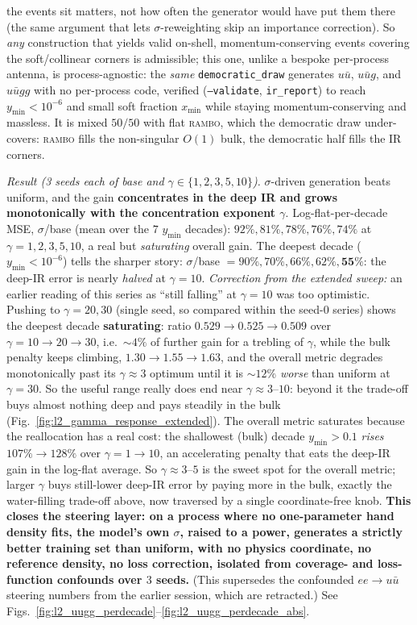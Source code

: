 \documentclass[11pt]{article}
\newcommand{\code}[1]{\texttt{#1}}
\begin{document}
the events sit matters, not how often the generator would have put them there (the same argument that
lets $\sigma$-reweighting skip an importance correction). So \emph{any} construction that yields valid
on-shell, momentum-conserving events covering the soft/collinear corners is admissible; this one,
unlike a bespoke per-process antenna, is process-agnostic: the \emph{same} \code{democratic\_draw}
generates $u\bar u$, $u\bar u g$, and $u\bar u gg$ with no per-process code, verified (\code{--validate},
\code{ir\_report}) to reach $y_{\min}\!<\!10^{-6}$ and small soft fraction $x_{\min}$ while staying
momentum-conserving and massless. It is mixed $50/50$ with flat \textsc{rambo}, which the democratic
draw under-covers: \textsc{rambo} fills the non-singular $O(1)$ bulk, the democratic half fills the
IR corners.

\emph{Result (3 seeds each of base and $\gamma\!\in\!\{1,2,3,5,10\}$).} $\sigma$-driven generation
beats uniform, and the gain \textbf{concentrates in the deep IR and grows monotonically with the
concentration exponent $\gamma$}. Log-flat-per-decade MSE, $\sigma$/base (mean over the $7$ $y_{\min}$
decades): $92\%,81\%,78\%,76\%,74\%$ at $\gamma{=}1,2,3,5,10$, a real but \emph{saturating} overall
gain. The deepest decade ($y_{\min}\!<\!10^{-6}$) tells the sharper story: $\sigma$/base
$=90\%,70\%,66\%,62\%,\mathbf{55\%}$: the deep-IR error is nearly \emph{halved} at $\gamma{=}10$.
\emph{Correction from the extended sweep:} an earlier reading of this series as ``still falling'' at
$\gamma{=}10$ was too optimistic. Pushing to $\gamma=20,30$ (single seed, so compared within the seed-0
series) shows the deepest decade \textbf{saturating}: ratio $0.529\to0.525\to0.509$ over
$\gamma=10\to20\to30$, i.e.\ $\sim\!4\%$ of further gain for a trebling of $\gamma$, while the bulk
penalty keeps climbing, $1.30\to1.55\to1.63$, and the overall metric degrades monotonically past its
$\gamma\!\approx\!3$ optimum until it is $\sim\!12\%$ \emph{worse} than uniform at $\gamma{=}30$.
So the useful range really does end near $\gamma\!\approx\!3$--$10$: beyond it the trade-off buys almost
nothing deep and pays steadily in the bulk (Fig.~\ref{fig:l2_gamma_response_extended}). The overall metric saturates because the reallocation has a real cost: the shallowest
(bulk) decade $y_{\min}\!>\!0.1$ \emph{rises} $107\%\!\to\!128\%$ over $\gamma{=}1\!\to\!10$, an
accelerating penalty that eats the deep-IR gain in the log-flat average. So $\gamma\!\approx\!3$--$5$ is
the sweet spot for the overall metric; larger $\gamma$ buys still-lower deep-IR error by paying more in
the bulk, exactly the water-filling trade-off above, now traversed by a single coordinate-free
knob. \textbf{This closes the steering layer: on a process where no one-parameter hand density fits, the model's own
$\sigma$, raised to a power, generates a strictly better training set than uniform, with no physics
coordinate, no reference density, no loss correction, isolated from coverage- and loss-function
confounds over $3$ seeds.} (This supersedes the confounded $ee\to u\bar u$ steering numbers from the earlier
session, which are retracted.) See Figs.~\ref{fig:l2_uugg_perdecade}--\ref{fig:l2_uugg_perdecade_abs}.
\end{document}

